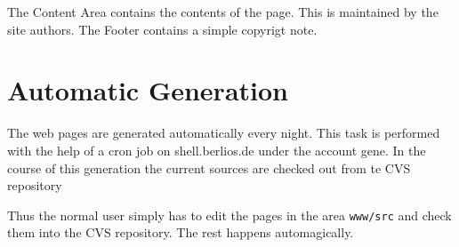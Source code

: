 The Content Area contains the contents of the page. This is maintained
by the site authors. The Footer contains a simple copyrigt note.


\section{Automatic Generation}

The web pages are generated automatically every night. This task is
performed with the help of a cron job on shell.berlios.de under the
account gene. In the course of this generation the current sources are
checked out from te CVS repository

Thus the normal user simply has to edit the pages in the area
\texttt{www/src} and check them into the CVS repository. The rest
happens automagically.

